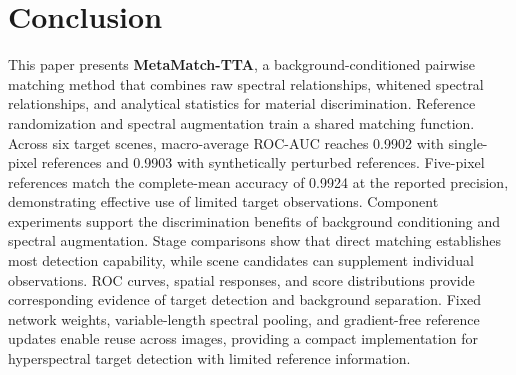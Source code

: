 \documentclass[a4paper,11pt]{article}
\newcommand{\method}{\textbf{MetaMatch-TTA}}
\begin{document}
\section{Conclusion}
This paper presents \method{}, a background-conditioned pairwise matching method that combines raw spectral relationships, whitened spectral relationships, and analytical statistics for material discrimination. Reference randomization and spectral augmentation train a shared matching function. Across six target scenes, macro-average ROC-AUC reaches 0.9902 with single-pixel references and 0.9903 with synthetically perturbed references. Five-pixel references match the complete-mean accuracy of 0.9924 at the reported precision, demonstrating effective use of limited target observations. Component experiments support the discrimination benefits of background conditioning and spectral augmentation. Stage comparisons show that direct matching establishes most detection capability, while scene candidates can supplement individual observations. ROC curves, spatial responses, and score distributions provide corresponding evidence of target detection and background separation. Fixed network weights, variable-length spectral pooling, and gradient-free reference updates enable reuse across images, providing a compact implementation for hyperspectral target detection with limited reference information.
\end{document}
